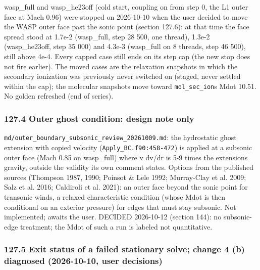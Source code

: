 \documentclass[english,a4paper]{my_memo}
\begin{document}
wasp\_full and wasp\_he23off (cold start, coupling on from step 0, the L1 outer
face at Mach 0.96) were stopped on 2026-10-10 when the user decided to move
the WASP outer face past the sonic point (section 127.6): at that time the face
spread stood at 1.7e-2 (wasp\_full, step 28 500, one thread), 1.3e-2
(wasp\_he23off, step 35 000) and 4.3e-3 (wasp\_full on 8 threads, step 46 500),
still above 4e-4. Every capped case still ends on its step cap (the new stop
does not fire earlier). The moved cases are the relaxation snapshots in which the secondary
ionization was previously never switched on (staged, never settled within the
cap); the molecular snapshots move toward \texttt{mol\_sec\_ion}\textquotesingle s Mdot 10.51. No
golden refreshed (end of series).

\subsubsection{127.4 Outer ghost condition: design note only}\label{1274-outer-ghost-condition-design-note-only}

\texttt{md/outer\_boundary\_subsonic\_review\_20261009.md}: the hydrostatic ghost
extension with copied velocity (\texttt{Apply\_BC.f90:458-472}) is applied at a
subsonic outer face (Mach 0.85 on wasp\_full) where v dv/dr is 5-9 times the
extension\textquotesingle s gravity, outside the validity its own comment states. Options
from the published sources (Thompson 1987, 1990; Poinsot \& Lele 1992;
Murray-Clay et al. 2009; Salz et al. 2016; Caldiroli et al. 2021): an outer
face beyond the sonic point for transonic winds, a relaxed characteristic
condition (whose Mdot is then conditional on an exterior pressure) for edges
that must stay subsonic. Not implemented; awaits the user. DECIDED 2026-10-12
(section 144): no subsonic-edge treatment; the Mdot of such a run is labeled
not quantitative.

\subsubsection{127.5 Exit status of a failed stationary solve; change 4 (b) diagnosed (2026-10-10, user decisions)}\label{1275-exit-status-of-a-failed-stationary-solve-change-4-b-diagnosed-2026-10-10-user-decisions}
\end{document}
